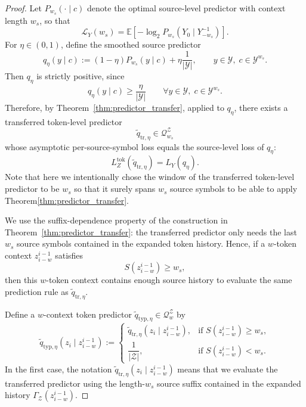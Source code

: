 \documentclass{article}
\theoremstyle{plain}
\theoremstyle{definition}
\theoremstyle{remark}
\begin{document}
    \begin{proof}
    Let $P_{w_s}(\cdot\mid c)$ denote the optimal source-level predictor with
    context length $w_s$, so that
    \[
        \mathcal L_Y(w_s)
        =
        \mathbb E\!\left[
            -\log_2 P_{w_s}(Y_0\mid Y_{-w_s}^{-1})
        \right].
    \]
    For $\eta\in(0,1)$, define the smoothed source predictor
    \[
        q_\eta(y\mid c)
        :=
        (1-\eta)P_{w_s}(y\mid c)
        +
        \eta\frac{1}{|\mathcal Y|},
        \qquad
        y\in\mathcal Y,\; c\in\mathcal Y^{w_s}.
    \]
    Then $q_\eta$ is strictly positive, since
    \[
        q_\eta(y\mid c)\ge \frac{\eta}{|\mathcal Y|}
        \qquad
        \forall y\in\mathcal Y,\; c\in\mathcal Y^{w_s}.
    \]
    Therefore, by Theorem~\ref{thm:predictor_transfer}, applied to $q_\eta$, there
    exists a transferred token-level predictor
    \[
        \tilde q_{\mathrm{tr},\eta}
        \in
        \mathcal Q_{w_s}^{\mathcal Z}
    \]
    whose asymptotic per-source-symbol loss equals the source-level loss of
    $q_\eta$:
    \[
        L_Z^{\mathrm{tok}}(\tilde q_{\mathrm{tr},\eta})
        =
        L_Y(q_\eta).
    \]
    Note that here we intentionally chose the window of the transferred  token-level predictor to be $w_s$ so that it surely spans $w_s$ source symbols to be able to apply Theorem\ref{thm:predictor_transfer}.
    
    We use the suffix-dependence property of the construction in
    Theorem~\ref{thm:predictor_transfer}: the transferred predictor only needs the
    last $w_s$ source symbols contained in the expanded token history. Hence, if a
    $w$-token context $z_{i-w}^{i-1}$ satisfies
    \[
        S(z_{i-w}^{i-1})\ge w_s,
    \]
    then this $w$-token context contains enough source history to evaluate the same
    prediction rule as $\tilde q_{\mathrm{tr},\eta}$.
    
    Define a $w$-context token predictor
    $\tilde q_{\mathrm{typ},\eta}\in\mathcal Q_w^{\mathcal Z}$ by
    \[
    \tilde q_{\mathrm{typ},\eta}(z_i\mid z_{i-w}^{i-1})
    :=
    \begin{cases}
    \tilde q_{\mathrm{tr},\eta}(z_i\mid z_{i-w}^{i-1}),
    &
    \text{if } S(z_{i-w}^{i-1})\ge w_s, \\[1ex]
    \dfrac{1}{|\mathcal Z|},
    &
    \text{if } S(z_{i-w}^{i-1})<w_s.
    \end{cases}
    \]
    In the first case, the notation
    $\tilde q_{\mathrm{tr},\eta}(z_i\mid z_{i-w}^{i-1})$ means that we evaluate the
    transferred predictor using the length-$w_s$ source suffix contained in the
    expanded history $\Gamma_{\mathcal Z}(z_{i-w}^{i-1})$.
    

\end{proof}
\end{document}
